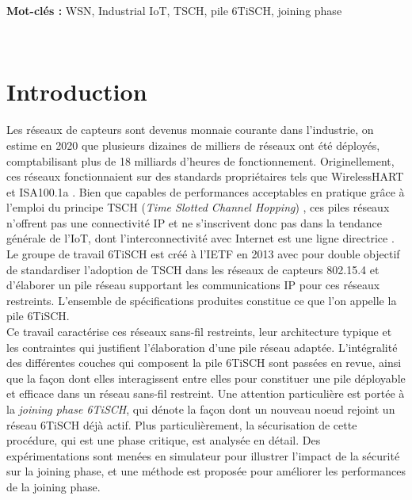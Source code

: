 \documentclass[]{report}
\begin{document}
\vspace{2cm}

\textbf{Mot-clés :} WSN, Industrial IoT, TSCH, pile 6TiSCH, joining phase 

\normalsize

\newpage
~
\newpage

\tableofcontents

\newpage


\chapter*{Introduction}

\large 

Les réseaux de capteurs sont devenus monnaie courante dans l'industrie, on estime en 2020 que plusieurs dizaines de milliers de réseaux ont été déployés, comptabilisant plus de 18 milliards d'heures de fonctionnement. Originellement, ces réseaux fonctionnaient sur des standards propriétaires tels que WirelessHART et ISA100.1a \cite{stack-IoT}. Bien que capables de performances acceptables en pratique grâce à l'emploi du principe TSCH (\textit{Time Slotted Channel Hopping}) \cite{decentralized}, ces piles réseaux n'offrent pas une connectivité IP et ne s'inscrivent donc pas dans la tendance générale de l'IoT, dont l'interconnectivité avec Internet est une ligne directrice \cite{stack-IoT}. Le groupe de travail 6TiSCH est créé à l'IETF en 2013 avec pour double objectif de standardiser l'adoption de TSCH dans les réseaux de capteurs 802.15.4 et d'élaborer un pile réseau supportant les communications IP pour ces réseaux restreints. L'ensemble de spécifications produites constitue ce que l'on appelle la pile 6TiSCH.\\

Ce travail caractérise ces réseaux sans-fil restreints, leur architecture typique et les contraintes qui justifient l'élaboration d'une pile réseau adaptée. L'intégralité des différentes couches qui composent la pile 6TiSCH sont passées en revue, ainsi que la façon dont elles interagissent entre elles pour constituer une pile déployable et efficace dans un réseau sans-fil restreint. Une attention particulière est portée à la \textit{joining phase 6TiSCH}, qui dénote la façon dont un nouveau noeud rejoint un réseau 6TiSCH déjà actif. Plus particulièrement, la sécurisation de cette procédure, qui est une phase critique, est analysée en détail. Des expérimentations sont menées en simulateur pour illustrer l'impact de la sécurité sur la joining phase, et une méthode est proposée pour améliorer les performances de la joining phase.\\
\end{document}
